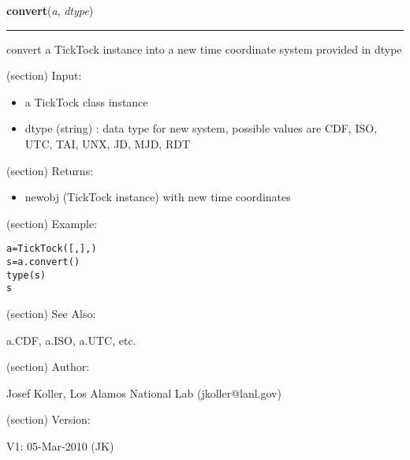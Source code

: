 \hspace{.8\funcindent}\begin{boxedminipage}{\funcwidth}

    \raggedright \textbf{convert}(\textit{a}, \textit{dtype})

    \vspace{-1.5ex}

    \rule{\textwidth}{0.5\fboxrule}
\setlength{\parskip}{2ex}
    convert a TickTock instance into a new time coordinate system provided 
    in dtype

    (section) Input:

      \begin{itemize}
      \setlength{\parskip}{0.6ex}
        \item a TickTock class instance

        \item dtype (string) : data type for new system, possible values are 
          CDF, ISO, UTC, TAI, UNX, JD, MJD, RDT

      \end{itemize}

    (section) Returns:

      \begin{itemize}
      \setlength{\parskip}{0.6ex}
        \item newobj (TickTock instance) with new time coordinates

      \end{itemize}

    (section) Example:

\begin{alltt}
\pysrcprompt{{\textgreater}{\textgreater}{\textgreater} }a = TickTock([, ], )
\pysrcprompt{{\textgreater}{\textgreater}{\textgreater} }s = a.convert()
\pysrcprompt{{\textgreater}{\textgreater}{\textgreater} }type(s)
\pysrcoutput{}\pysrcprompt{{\textgreater}{\textgreater}{\textgreater} }s
\end{alltt}
    (section) See Also:

      a.CDF, a.ISO, a.UTC, etc.

    (section) Author:

      Josef Koller, Los Alamos National Lab (jkoller@lanl.gov)

    (section) Version:

      V1: 05-Mar-2010 (JK)

\setlength{\parskip}{1ex}
    \end{boxedminipage}

